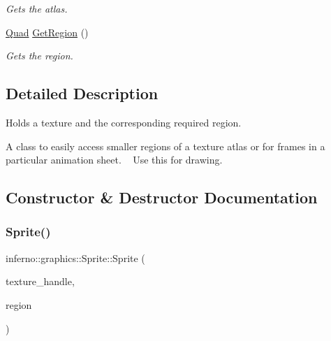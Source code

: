 \begin{DoxyCompactItemize}
\begin{DoxyCompactList}\small\item\em Gets the atlas. \end{DoxyCompactList}\item 
\mbox{\hyperlink{classinferno_1_1graphics_1_1_quad}{Quad}} \mbox{\hyperlink{classinferno_1_1graphics_1_1_sprite_ad2f468c9390d0d952f049daba69ef53f}{Get\+Region}} ()
\begin{DoxyCompactList}\small\item\em Gets the region. \end{DoxyCompactList}\end{DoxyCompactItemize}


\subsection{Detailed Description}
Holds a texture and the corresponding required region. 

A class to easily access smaller regions of a texture atlas or for frames in a particular animation sheet. ~\newline
Use this for drawing. 

\subsection{Constructor \& Destructor Documentation}
\mbox{\label{classinferno_1_1graphics_1_1_sprite_a404b45a087a04018e5e2bc5c7b59ab67}} 
\subsubsection{\texorpdfstring{Sprite()}{Sprite()}\hspace{0.1cm}{\footnotesize\ttfamily [1/2]}}
{\footnotesize\ttfamily inferno\+::graphics\+::\+Sprite\+::\+Sprite (\begin{DoxyParamCaption}\item[{\mbox{\hyperlink{namespaceinferno_1_1graphics_a9d719bfbfedd17b9ace9b8d603ab5a38}{Texture\+Handle}}}]{texture\+\_\+handle,  }\item[{\mbox{\hyperlink{classinferno_1_1graphics_1_1_quad}{Quad}}}]{region }\end{DoxyParamCaption})\hspace{0.3cm}{\ttfamily [inline]}}



